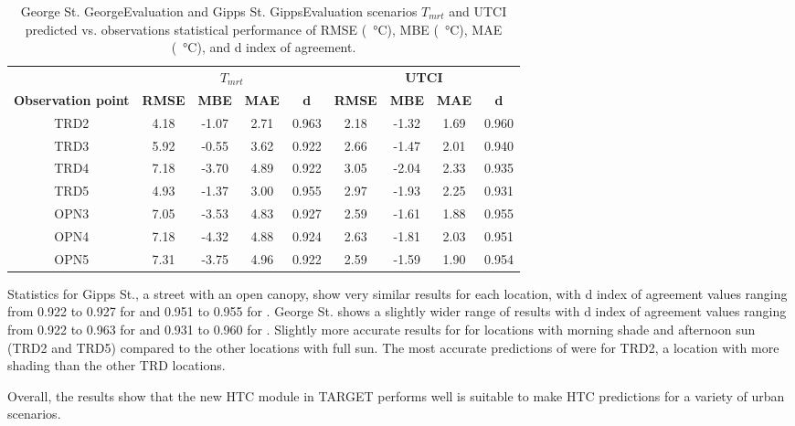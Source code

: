 \documentclass[final,3p,times,authoryear]{elsarticle}
\begin{document}
\begin{center}
\begin{table}
\caption{George St. GeorgeEvaluation and Gipps St. GippsEvaluation scenarios $T_{mrt}$ and UTCI predicted vs. observations statistical performance of RMSE (\SI{}{\degreeCelsius}), MBE (\SI{}{\degreeCelsius}), MAE (\SI{}{\degreeCelsius}), and d index of agreement.\label{tab:georgetmrt}}
  \begin{tabular}{ |c|c | c |c |c  | c | c |  c|c|}   
  \hline    &  \multicolumn{4}{c|}{\textbf{$T_{mrt}$}} & \multicolumn{4}{c|}{\textbf{UTCI}}  \\  
  \textbf{Observation point} 
	& \textbf{RMSE} 
	& \textbf{MBE} 
	& \textbf{MAE} 
	& \textbf{d} 
	& \textbf{RMSE} 
	& \textbf{MBE} 
	& \textbf{MAE}
	& \textbf{d}	
	\\ \hline
TRD2 & 4.18 & -1.07 & 2.71 & 0.963 & 2.18 & -1.32 & 1.69 & 0.960  \\ \hline
TRD3 & 5.92 & -0.55 & 3.62 & 0.922 & 2.66 & -1.47 & 2.01 & 0.940  \\ \hline
TRD4 & 7.18 & -3.70 & 4.89 & 0.922 & 3.05 & -2.04 & 2.33 & 0.935  \\ \hline
TRD5 & 4.93 & -1.37 & 3.00 & 0.955 & 2.97 & -1.93 & 2.25 & 0.931  \\ \hline
OPN3 & 7.05 & -3.53 & 4.83 & 0.927 & 2.59 & -1.61 & 1.88 & 0.955   \\ \hline
OPN4 & 7.18 & -4.32 & 4.88 & 0.924 & 2.63 & -1.81 & 2.03 & 0.951  \\ \hline
OPN5 & 7.31 & -3.75 & 4.96 & 0.922 & 2.59 & -1.59 & 1.90 & 0.954  \\ \hline
  \end{tabular} 
\end{table}
\end{center} 

Statistics for Gipps St., a street with an open canopy, show very similar results for each location, with d index of agreement values ranging from 0.922 to 0.927 for  and 0.951 to 0.955 for . George St. shows a slightly wider range of results with d index of agreement values ranging from 0.922 to 0.963 for  and 0.931 to 0.960 for . Slightly more accurate results for  for locations with morning shade and afternoon sun (TRD2 and TRD5) compared to the other locations with full sun. The most accurate predictions of  were for TRD2, a location with more shading than the other TRD locations. 

Overall, the results show that the new HTC module in TARGET performs well is suitable to make HTC predictions for a variety of urban scenarios.
\end{document}

